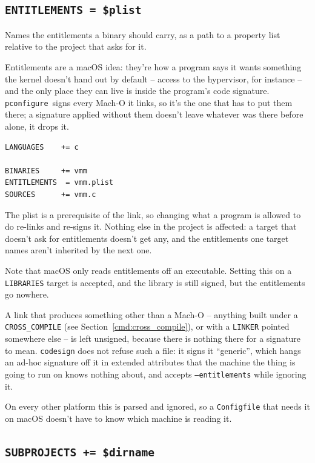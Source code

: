 \documentclass{article}
\newcommand{\pconfigure}{\texttt{pconfigure}}
\begin{document}
\subsection{\texttt{ENTITLEMENTS = \$plist} \label{cmd:entitlements}}

Names the entitlements a binary should carry, as a path to a property
list relative to the project that asks for it.

Entitlements are a macOS idea: they're how a program says it wants
something the kernel doesn't hand out by default -- access to the
hypervisor, for instance -- and the only place they can live is inside
the program's code signature.  \pconfigure\ signs every Mach-O it
links, so it's the one that has to put them there; a signature applied
without them doesn't leave whatever was there before alone, it drops
it.

\begin{verbatim}
LANGUAGES    += c

BINARIES     += vmm
ENTITLEMENTS  = vmm.plist
SOURCES      += vmm.c
\end{verbatim}

The plist is a prerequisite of the link, so changing what a program is
allowed to do re-links and re-signs it.  Nothing else in the project
is affected: a target that doesn't ask for entitlements doesn't get
any, and the entitlements one target names aren't inherited by the
next one.

Note that macOS only reads entitlements off an executable.  Setting
this on a \texttt{LIBRARIES} target is accepted, and the library is
still signed, but the entitlements go nowhere.

A link that produces something other than a Mach-O -- anything built
under a \texttt{CROSS\_COMPILE} (see
Section~\ref{cmd:cross_compile}), or with a \texttt{LINKER} pointed
somewhere else -- is left unsigned, because there is nothing there for
a signature to mean.  \texttt{codesign} does not refuse such a file:
it signs it ``generic'', which hangs an ad-hoc signature off it in
extended attributes that the machine the thing is going to run on
knows nothing about, and accepts \texttt{--entitlements} while
ignoring it.

On every other platform this is parsed and ignored, so a
\texttt{Configfile} that needs it on macOS doesn't have to know which
machine is reading it.

\subsection{\texttt{SUBPROJECTS += \$dirname} \label{cmd:subprojects}}
\end{document}
